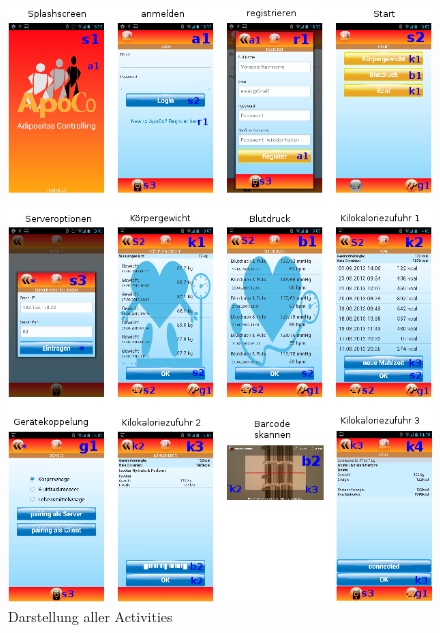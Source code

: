 \begin{figure}[h]
  \centering
  \includegraphics[scale=0.6]{diagramme/kapitel6/android/activity_map.png}
  \caption{Darstellung aller Activities}
  
\end{figure}

